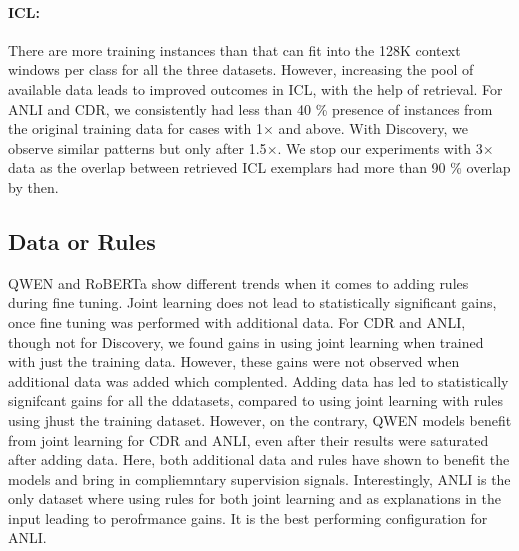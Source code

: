 \paragraph{ICL:} There are more training instances than that can fit into the 128K context windows per class for all the three datasets. However, increasing the pool of available data leads to improved outcomes in ICL, with the help of retrieval. For ANLI and CDR, we consistently had less than 40 \% presence of instances from the original training data for cases with 1$\times$ and above. With Discovery, we observe similar patterns but only after  1.5$\times$. We stop our experiments with 3$\times$ data as the overlap between retrieved ICL exemplars had more than 90 \% overlap by then.  





\subsection{Data or Rules}

QWEN and RoBERTa show different trends when it comes to adding rules during fine tuning. Joint learning does not lead to statistically significant gains, once fine tuning was performed with additional data. For CDR and ANLI, though not for Discovery, we found gains in using joint learning when trained with just the training data. However, these gains were not observed when additional data was added which complented. Adding data has led to statistically signifcant gains for all the ddatasets, compared to using joint learning with rules using jhust the training dataset. However, on the contrary, QWEN models benefit from joint learning for CDR and ANLI, even after their results were saturated after adding data. Here, both additional data and rules have shown to benefit the models and bring in compliemntary supervision signals. Interestingly, ANLI is the only dataset where using rules for both joint learning and as explanations in the input leading to perofrmance gains. It is the best performing configuration for ANLI. 




